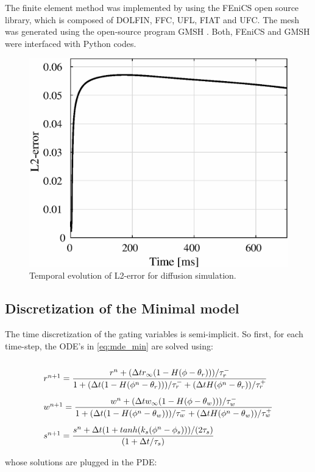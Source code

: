 The finite element method was implemented by using the FEniCS \cite{FENICS} open source library, which is composed of DOLFIN, FFC, UFL, FIAT and UFC. The mesh was generated using the open-source program GMSH \cite{GMSH}. Both, FEniCS and GMSH were interfaced with Python codes.


\begin{figure}[!htb]
	\centering
	\includegraphics[height = 5 cm]{fig/Verificacion_Teorema/error_L2}
	\caption{Temporal evolution of L2-error for diffusion simulation.} \label{fig:verification_error_L2}
\end{figure}


\subsection{Discretization of the Minimal model}

The time discretization of the gating variables is semi-implicit. So first, for each time-step, the ODE's in \eqref{eq:mde_min} are solved using:


\begin{equation}
\arraycolsep=1.4pt\def\arraystretch{2.8}
\begin{array}{l}
r^{n+1} = \dfrac{r^n + (\Delta t r_{\infty}(1 - H(\phi - \theta_r)))/\tau_r^-}{1  +  (\Delta t (1 - H(\phi^n - \theta_r)))/\tau_r^- + (\Delta t H(\phi^n - \theta_r))/\tau_r^+} \\

w^{n+1} = \dfrac{w^n + (\Delta t w_{\infty}(1 - H(\phi - \theta_w)))/\tau_w^-}{1  +  (\Delta t (1 - H(\phi^n - \theta_w)))/\tau_w^- + (\Delta t H(\phi^n - \theta_w))/\tau_w^+} \\
   
s^{n+1} = \dfrac{s^n + \Delta t (1 + tanh(k_s (\phi^n - \phi_s)))/(2 \tau_s)}{(1 + \Delta t / \tau_s)}
\end{array}  \label{eq:mono_disc_gating}
\end{equation}

whose solutions are plugged in the PDE:

